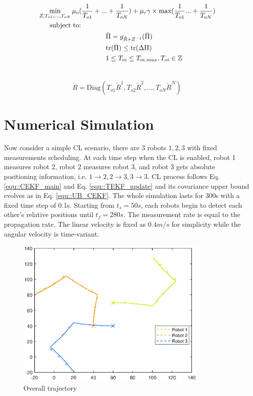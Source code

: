 \documentclass[conference]{IEEEtran}
\begin{document}
\begin{equation}
\begin{split}
&\min_{Z,T_{o1},...,T_{oN}}   \mu_o(\frac{1}{T_{o1}} +  ... + \frac{1}{T_{oN}}) + \mu_c \gamma \times \text{max}(\frac{1}{T_{o1}}  ... + \frac{1}{T_{oN}})
\\
& \hspace{0.6cm}\text{subject to:}
\\& \hspace{3.5cm} \bar{\Pi} = g_{\check{R}+Z^{-1}} (\bar{\Pi})
\\& \hspace{3.5cm}\text{tr}(\bar{\Pi}) \leq \text{tr} (\Delta \Pi)
\\& \hspace{3.5cm} 1 \leq T_{oi} \leq T_{oi,max}, T_{oi} \in \mathbb{Z}
\\& \hspace{3.5cm}
\end{split}
\end{equation}

\begin{equation*}
\check{R} = \text{Diag}(T_{o1}\check{R}^1,T_{o2}\check{R}^2,...,T_{oN}\check{R}^N)
\end{equation*}

\section{Numerical Simulation}
Now consider a simple CL scenario, there are 3 robots $1,2,3$ with fixed measurements scheduling.
At each time step when the CL is enabled, robot 1 measures robot 2, robot 2 measures robot 3, and robot 3 gets absolute positioning information, i.e. $1\rightarrow2, 2\rightarrow3, 3\rightarrow3$.
CL process follows Eq. \eqref{equ::CEKF_main} and Eq. \eqref{equ::TEKF_update} and its covariance upper bound evolves as in Eq. \eqref{equ::UB_CEKF}.
The whole simulation lasts for 300s with a fixed time step of 0.1s. Starting from $t_s=50s$, each robots begin to detect each other's relative positions until $t_f=280s$.
The measurement rate is equal to the propagation rate.
The linear velocity is fixed as $0.4m/s$ for simplicity while the angular velocity is time-variant.
\begin{figure}
	\centering
	\includegraphics[width=3.7in]{Fig/fig1_traj.eps}
	\caption{Overall trajectory}
	\label{fig::traj}
\end{figure}
\end{document}
